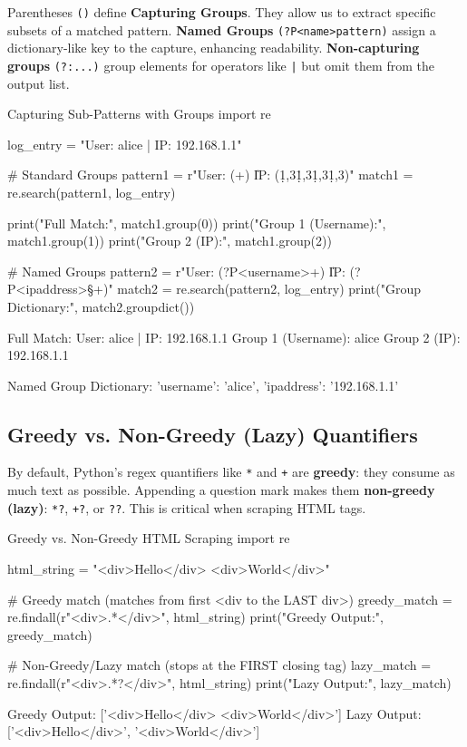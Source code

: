 Parentheses \texttt{()} define \textbf{Capturing Groups}. They allow us to extract specific subsets of a matched pattern. \textbf{Named Groups} \texttt{(?P<name>pattern)} assign a dictionary-like key to the capture, enhancing readability. \textbf{Non-capturing groups} \texttt{(?:...)} group elements for operators like \texttt{|} but omit them from the output list.

\begin{pythoncode}{Capturing Sub-Patterns with Groups}
import re

log_entry = "User: alice | IP: 192.168.1.1"

# Standard Groups
pattern1 = r"User: (\w+) \| IP: (\d{1,3}\.\d{1,3}\.\d{1,3}\.\d{1,3})"
match1 = re.search(pattern1, log_entry)

print("Full Match:", match1.group(0))
print("Group 1 (Username):", match1.group(1))
print("Group 2 (IP):", match1.group(2))

# Named Groups
pattern2 = r"User: (?P<username>\w+) \| IP: (?P<ipaddress>\S+)"
match2 = re.search(pattern2, log_entry)
print("\nNamed Group Dictionary:", match2.groupdict())
\end{pythoncode}
\begin{outputbox}
Full Match: User: alice | IP: 192.168.1.1
Group 1 (Username): alice
Group 2 (IP): 192.168.1.1

Named Group Dictionary: {'username': 'alice', 'ipaddress': '192.168.1.1'}
\end{outputbox}

\subsection{Greedy vs. Non-Greedy (Lazy) Quantifiers}

By default, Python's regex quantifiers like \texttt{*} and \texttt{+} are \textbf{greedy}: they consume as much text as possible. Appending a question mark makes them \textbf{non-greedy (lazy)}: \texttt{*?}, \texttt{+?}, or \texttt{??}. This is critical when scraping HTML tags.

\begin{pythoncode}{Greedy vs. Non-Greedy HTML Scraping}
import re

html_string = "<div>Hello</div> <div>World</div>"

# Greedy match (matches from first <div to the LAST div>)
greedy_match = re.findall(r"<div>.*</div>", html_string)
print("Greedy Output:", greedy_match)

# Non-Greedy/Lazy match (stops at the FIRST closing tag)
lazy_match = re.findall(r"<div>.*?</div>", html_string)
print("Lazy Output:", lazy_match)
\end{pythoncode}
\begin{outputbox}
Greedy Output: ['<div>Hello</div> <div>World</div>']
Lazy Output: ['<div>Hello</div>', '<div>World</div>']
\end{outputbox}


